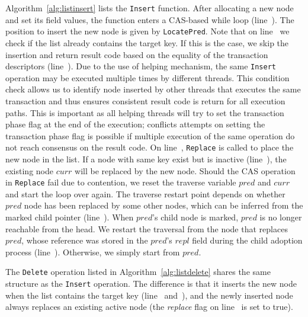 \documentclass[10pt,conference,compsocconf]{IEEEtran}
\begin{document}
Algorithm~\ref{alg:listinsert} lists the \texttt{Insert} function.
After allocating a new node and set its field values, the function enters a CAS-based while loop (line~).
The position to insert the new node is given by \texttt{LocatePred}.
Note that on line~ we check if the list already contains the target key.
If this is the case, we skip the insertion and return result code based on the equality of the transaction descriptors (line~).
Due to the use of helping mechanism, the same \texttt{Insert} operation may be executed multiple times by different threads.
This condition check allows us to identify node inserted by other threads that executes the same transaction and thus ensures consistent result code is return for all execution paths.
This is important as all helping threads will try to set the transaction phase flag at the end of the execution; conflicts attempts on setting the transaction phase flag is possible if multiple execution of the same operation do not reach consensus on the result code.
On line~, \texttt{Replace} is called to place the new node in the list.
If a node with same key exist but is inactive (line~), the existing node $curr$ will be replaced by the new node.
Should the CAS operation in \texttt{Replace} fail due to contention, we reset the traverse variable $pred$ and $curr$ and start the loop over again.
The traverse restart point depends on whether $pred$ node has been replaced by some other nodes, which can be inferred from the marked child pointer (line~).
When $pred$'s child node is marked, $pred$ is no longer reachable from the head.
We restart the traversal from the node that replaces $pred$, whose reference was stored in the $pred$'s $repl$ field during the child adoption process (line~).
Otherwise, we simply start from $pred$.

The \texttt{Delete} operation listed in Algorithm~\ref{alg:listdelete} shares the same structure as the \texttt{Insert} operation.
The difference is that it inserts the new node when the list contains the target key (line~ and~), and the newly inserted node always replaces an existing active node (the \textit{replace} flag on line~ is set to true).
\end{document}
